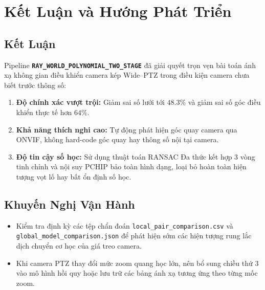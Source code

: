 \documentclass[11pt,a4paper]{article}
\begin{document}
\section{Kết Luận và Hướng Phát Triển}

\subsection{Kết Luận}
Pipeline \textbf{\texttt{RAY\_WORLD\_POLYNOMIAL\_TWO\_STAGE}} đã giải quyết trọn vẹn bài toán ánh xạ không gian điều khiển camera kép Wide--PTZ trong điều kiện camera chưa biết trước thông số:
\begin{enumerate}
    \item \textbf{Độ chính xác vượt trội:} Giảm sai số lưới tới $48.3\%$ và giảm sai số góc điều khiển thực tế hơn $64\%$.
    \item \textbf{Khả năng thích nghi cao:} Tự động phát hiện góc quay camera qua ONVIF, không hard-code góc quay hay thông số nội tại camera.
    \item \textbf{Độ tin cậy số học:} Sử dụng thuật toán RANSAC Đa thức kết hợp 3 vòng tinh chỉnh và nội suy PCHIP bảo toàn hình dạng, loại bỏ hoàn toàn hiện tượng vọt lố hay bất ổn định số học.
\end{enumerate}

\subsection{Khuyến Nghị Vận Hành}
\begin{itemize}
    \item Kiểm tra định kỳ các tệp chẩn đoán \texttt{local\_pair\_comparison.csv} và \texttt{global\_model\_comparison.json} để phát hiện sớm các hiện tượng rung lắc dịch chuyển cơ học của giá treo camera.
    \item Khi camera PTZ thay đổi mức zoom quang học lớn, nên bổ sung chiều thứ 3 vào mô hình hồi quy hoặc lưu trữ các bảng ánh xạ tương ứng theo từng mốc zoom.
\end{itemize}
\end{document}
